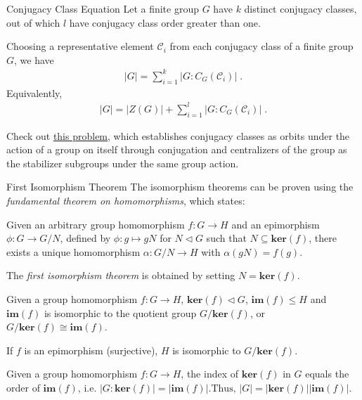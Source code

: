 \documentclass{beamer}
\newcommand\italictext[1]{\textcolor{italics}{\textit{#1}}}
\begin{document}
\begin{frame}{Conjugacy Class Equation}
    Let a finite group $G$ have $k$ distinct conjugacy classes, out of which $l$ have conjugacy class order greater than one.
    \begin{theorem}
        Choosing a representative element $\mathcal{C}_i$ from each conjugacy class of a finite group $G$, we have
        \vspace{-0.75em}
        \begin{align*}
            \lvert G\rvert=\sum\limits_{i=1}^{k}\lvert G:C_G(\mathcal{C}_i)\rvert \;.
        \end{align*}
        Equivalently,
        \vspace{-0.75em}
        \begin{align*}
            \lvert G\rvert=\lvert Z(G)\rvert+\sum\limits_{i=1}^{l}\lvert G:C_G(\mathcal{C}_i)\rvert \;.
        \end{align*}
    \end{theorem}
    Check out \hyperlink{ex_class_eq}{\color[rgb]{0.7,0.0,0.1}this problem}, which establishes conjugacy classes as orbits under the action of a group on itself through conjugation and centralizers of the group as the stabilizer subgroups under the same group action.
\end{frame}

\begin{frame}{First Isomorphism Theorem}
    The isomorphism theorems can be proven using the \italictext{fundamental theorem on homomorphisms}, which states:
    \vspace{-0.1em}
    \begin{theorem}
        Given an arbitrary group homomorphism $f:G\xrightarrow{}H$ and an epimorphism $\phi:G\xrightarrow{}G/N$, defined by $\phi:g\mapsto gN$ for $N\vartriangleleft G$ such that $N\subseteq\mathbf{ker}(f)$, there exists a unique homomorphism $\alpha:G/N\xrightarrow{}H$ with $\alpha(gN)=f(g)$.
    \end{theorem}
    \vspace{-0.1em}
    The \italictext{first isomorphism theorem} is obtained by setting $N=\mathbf{ker}(f)$.
    \vspace{-0.1em}
    \begin{theorem}[1]
        Given a group homomorphism $f:G\xrightarrow{}H$, $\mathbf{ker}(f) \vartriangleleft G$, $\mathbf{im}(f)\leq H$ and $\mathbf{im}(f)$ is isomorphic to the quotient group $G/\mathbf{ker}(f)$, or $G/\mathbf{ker}(f)\cong\mathbf{im}(f)$.
    \end{theorem}
    \vspace{-0.1em}
    If $f$ is an epimorphism (surjective), $H$ is isomorphic to $G/\mathbf{ker}(f)$.
    \vspace{-0.1em}
    \begin{corollary}
        Given a group homomorphism $f:G\xrightarrow{}H$, the index of $\mathbf{ker}(f)$ in $G$ equals the order of $\mathbf{im}(f)$, i.e. $\lvert G:\mathbf{ker}(f)\rvert=\lvert\mathbf{im}(f)\rvert\text{.Thus, }\lvert G\rvert=\lvert\mathbf{ker}(f)\rvert\lvert\mathbf{im}(f)\rvert$.
    \end{corollary}
\end{frame}
\end{document}
